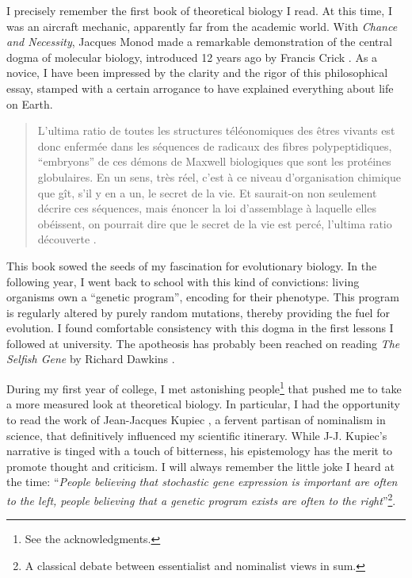 

\label{ch:general_introduction:foreword}

I precisely remember the first book of theoretical biology I read. At this time, I was an aircraft mechanic, apparently far from the academic world. With \textit{Chance and Necessity}, Jacques Monod made a remarkable demonstration of the central dogma of molecular biology, introduced 12 years ago by Francis Crick \citep{crick-1958}. As a novice, I have been impressed by the clarity and the rigor of this philosophical essay, stamped with a certain arrogance to have explained everything about life on Earth.

\begin{quote}
L'ultima ratio de toutes les structures t\'{e}l\'{e}onomiques des \^{e}tres vivants est donc enferm\'{e}e dans les s\'{e}quences de radicaux des fibres polypeptidiques, ``embryons'' de ces d\'{e}mons de Maxwell biologiques que sont les prot\'{e}ines globulaires. En un sens, tr\`es r\'{e}el, c'est \`a ce niveau d'organisation chimique que g\^{i}t, s'il y en a un, le secret de la vie. Et saurait-on non seulement d\'{e}crire ces s\'{e}quences, mais \'{e}noncer la loi d'assemblage \`a laquelle elles ob\'{e}issent, on pourrait dire que le secret de la vie est perc\'{e}, l'ultima ratio d\'{e}couverte \citep{monod-1970}.
\end{quote}

This book sowed the seeds of my fascination for evolutionary biology.
In the following year, I went back to school with this kind of convictions: living organisms own a ``genetic program'', encoding for their phenotype.
This program is regularly altered by purely random mutations, thereby providing the fuel for evolution. I found comfortable consistency with this dogma in the first lessons I followed at university. The apotheosis has probably been reached on reading \textit{The Selfish Gene} by Richard Dawkins \citep{dawkins-1976}.

During my first year of college, I met astonishing people\footnote{See the acknowledgments.} that pushed me to take a more measured look at theoretical biology. In particular, I had the opportunity to read the work of Jean-Jacques Kupiec \citep{kupiec-2000,kupiec-2008}, a fervent partisan of nominalism in science, that definitively influenced my scientific itinerary. While J-J. Kupiec's narrative is tinged with a touch of bitterness, his epistemology has the merit to promote thought and criticism. I will always remember the little joke I heard at the time: ``\textit{People believing that stochastic gene expression is important are often to the left, people believing that a genetic program exists are often to the right}''\footnote{A classical debate between essentialist and nominalist views in sum.}. 

